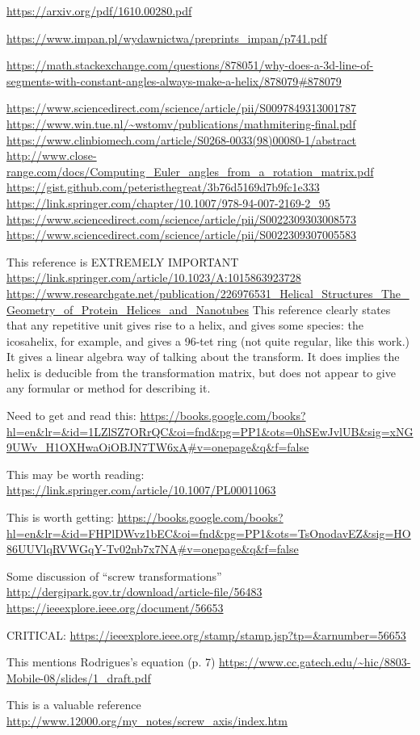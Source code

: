 \documentclass[11pt]{article}
\begin{document}
\url{https://arxiv.org/pdf/1610.00280.pdf}

\url{https://www.impan.pl/wydawnictwa/preprints_impan/p741.pdf}

\url{https://math.stackexchange.com/questions/878051/why-does-a-3d-line-of-segments-with-constant-angles-always-make-a-helix/878079#878079}

\url{https://www.sciencedirect.com/science/article/pii/S0097849313001787}
\url{https://www.win.tue.nl/~wstomv/publications/mathmitering-final.pdf}
\url{https://www.clinbiomech.com/article/S0268-0033(98)00080-1/abstract}
\url{http://www.close-range.com/docs/Computing_Euler_angles_from_a_rotation_matrix.pdf}
\url{https://gist.github.com/peteristhegreat/3b76d5169d7b9fc1e333}
\url{https://link.springer.com/chapter/10.1007/978-94-007-2169-2_95}
\url{https://www.sciencedirect.com/science/article/pii/S0022309303008573}
\url{https://www.sciencedirect.com/science/article/pii/S0022309307005583}

This reference is EXTREMELY IMPORTANT
\url{https://link.springer.com/article/10.1023/A:1015863923728}
\url{https://www.researchgate.net/publication/226976531_Helical_Structures_The_Geometry_of_Protein_Helices_and_Nanotubes}
This reference clearly states that any repetitive unit gives rise to a helix, and gives some species: the icosahelix, for example, and gives a 96-tet ring (not quite regular, like this work.)  It gives a linear algebra way of talking about the transform. It does implies the helix is deducible from the transformation matrix, but does not appear to give any formular or method for describing it.

Need to get and read this:
\url{https://books.google.com/books?hl=en&lr=&id=1LZlSZ7ORrQC&oi=fnd&pg=PP1&ots=0hSEwJvlUB&sig=xNG9UWv_H1OXHwaOiOBJN7TW6xA#v=onepage&q&f=false}

This may be worth reading:
\url{https://link.springer.com/article/10.1007/PL00011063}

This is worth getting:
\url{https://books.google.com/books?hl=en&lr=&id=FHPlDWvz1bEC&oi=fnd&pg=PP1&ots=TsOnodavEZ&sig=HO86UUVlqRVWGqY-Tv02nb7x7NA#v=onepage&q&f=false}

Some discussion of ``screw transformations''
\url{http://dergipark.gov.tr/download/article-file/56483}
\url{https://ieeexplore.ieee.org/document/56653}

CRITICAL:
\url{https://ieeexplore.ieee.org/stamp/stamp.jsp?tp=&arnumber=56653}

This mentions Rodrigues's equation (p. 7)
\url{https://www.cc.gatech.edu/~hic/8803-Mobile-08/slides/1_draft.pdf}

This is a valuable reference
\url{http://www.12000.org/my_notes/screw_axis/index.htm}




\end{document}
